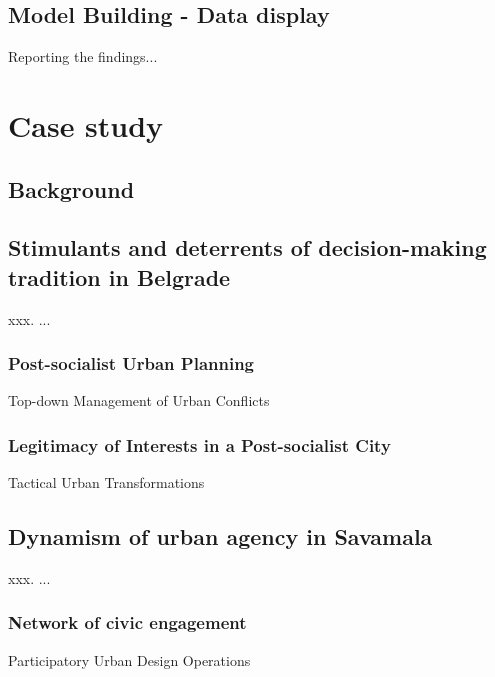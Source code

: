 \documentclass[11pt]{report}
\begin{document}
\section{Model Building - Data display}

Reporting the findings...


\chapter{Case study}


\section{Background}


\section{Stimulants and deterrents of decision-making tradition in Belgrade}

xxx. ...

\subsection{Post-socialist Urban Planning}

Top-down Management of Urban Conflicts

\subsection{Legitimacy of Interests in a Post-socialist City}

Tactical Urban Transformations 

\section{Dynamism of urban agency in Savamala}

xxx. ...

\subsection{Network of civic engagement}

Participatory Urban Design Operations


\end{document}

